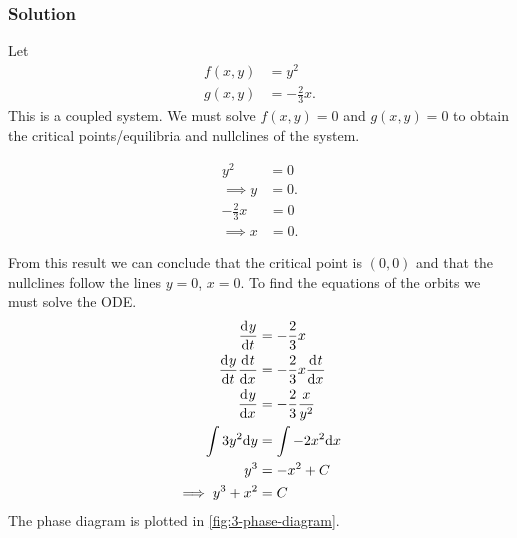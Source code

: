 \documentclass[12pt]{article}
\begin{document}
\subsubsection*{Solution}
Let
\begin{equation}
  \begin{aligned}
    f(x,y) &= y^2 \\
    g(x,y) &= -\frac{2}{3}x.
  \end{aligned}
\end{equation}
This is a coupled system. We must solve $f(x,y)=0$ and $g(x,y)=0$ to obtain the
critical points/equilibria and nullclines of the system.
\begin{multicols}{2}
  \begin{equation*}
    \begin{aligned}
      y^2 &= 0 \\
      \implies y &= 0.
    \end{aligned}
  \end{equation*}
  \begin{equation*}
    \begin{aligned}
      -\frac{2}{3}x &= 0 \\
      \implies x &= 0.
    \end{aligned}
  \end{equation*}
\end{multicols} \noindent
From this result we can conclude that the critical point is $(0,0)$ and that the
nullclines follow the lines $y=0$, $x=0$. To find the equations of the orbits we
must solve the ODE.
\begin{equation}
  \begin{aligned}
    \frac{\mathrm{d}^{} {y}}{\mathrm{d}{t}^{}} &= -\frac{2}{3}x \\
    \frac{\mathrm{d}^{} {y}}{\mathrm{d}{t}^{}} \frac{\mathrm{d}^{} {t}}{\mathrm{d}{x}^{}} &= -\frac{2}{3}x \frac{\mathrm{d}^{} {t}}{\mathrm{d}{x}^{}} \\
    \frac{\mathrm{d}^{} {y}}{\mathrm{d}{x}^{}} &= -\frac{2}{3}\frac{x}{y^2} \\
    \int 3y^2 \mathrm{d}{y} &= \int -2x^2 \mathrm{d}{x} \\
    y^3 &= -x^2 + C \\
    \implies y^3 + x^2 &= C
  \end{aligned}
\end{equation}
The phase diagram is plotted in \cref{fig:3-phase-diagram}.

\end{document}
